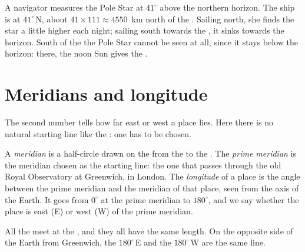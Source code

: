 \begin{example}\label{ex:g6:latitude-longitude:pole-star}
A navigator measures the Pole Star at $41^\circ$ above the northern
horizon. The ship is at  $41^\circ$\,N, about $41 \times 111
\approx \num{4550}$~km north of the . Sailing north, she finds the
star a little higher each night; sailing south towards the , it
sinks towards the horizon. South of the  the Pole Star cannot be
seen at all, since it stays below the horizon: there, the noon Sun gives
the .
\end{example}

\section{Meridians and longitude}

The second number tells how far east or west a place lies. Here there is no
natural starting line like the : one has to be chosen.

\begin{definition}\label{def:g6:latitude-longitude:longitude}
A \emph{meridian} is a half-circle drawn on the  from the
 to the . The \emph{prime meridian}
is the meridian chosen as the starting line: the one that passes through the
old Royal Observatory at Greenwich, in London. The
\emph{longitude} of a place is the angle between the prime
meridian and the meridian of that place, seen from the axis of the Earth. It
goes from $0^\circ$ at the prime meridian to $180^\circ$, and we say whether
the place is east (E) or west (W) of the prime meridian.
\end{definition}

All the  meet at the , and they all have the same length. On
the opposite side of the Earth from Greenwich, the  $180^\circ$\,E
and the  $180^\circ$\,W are the same line.


